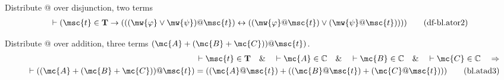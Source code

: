 \begin{metadefinition} {Distribute @ over disjunction, two
terms}
\begin{align}
\vdash ( \msc{t} \in \mathbf{T} \rightarrow ( ( ( \mw{\varphi} \vee \mw{\psi} )
    @ \msc{t} ) \leftrightarrow ( ( \mw{\varphi} @ \msc{t} ) \vee ( \mw{\psi} @
    \msc{t} ) ) ) )\label{eq:df-bl.ator2}\tag{df-bl.ator2}
\end{align}
\end{metadefinition}


\begin{lemma} {Distribute @ over addition, three terms} $(
\mc{A} + ( \mc{B} + \mc{C} ) ) @ \msc{t} )$.
\begin{align}
\vdash \msc{t} \in \mathbf{T}\quad\&\quad \vdash \mc{A} \in \mathbb{C}\quad\&\quad
    \vdash \mc{B} \in \mathbb{C}\quad\&\quad \vdash \mc{C} \in
    \mathbb{C}\quad\Rightarrow \notag \\
    \quad \vdash ( ( \mc{A} + ( \mc{B} + \mc{C} ) ) @ \msc{t} ) = (
    ( \mc{A} @ \msc{t} ) + ( ( \mc{B} @ \msc{t} ) + ( \mc{C} @ \msc{t} ) )
    )\label{eq:bl.atad3}\tag{bl.atad3}
\end{align}
\end{lemma}


